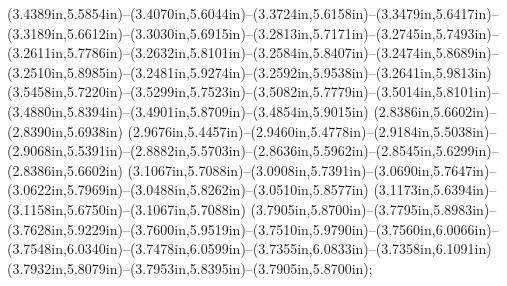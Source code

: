 (3.4389in,5.5854in)--(3.4070in,5.6044in)--(3.3724in,5.6158in)--(3.3479in,5.6417in)--(3.3189in,5.6612in)--(3.3030in,5.6915in)--(3.2813in,5.7171in)--(3.2745in,5.7493in)--(3.2611in,5.7786in)--(3.2632in,5.8101in)--(3.2584in,5.8407in)--(3.2474in,5.8689in)--(3.2510in,5.8985in)--(3.2481in,5.9274in)--(3.2592in,5.9538in)--(3.2641in,5.9813in) (3.5458in,5.7220in)--(3.5299in,5.7523in)--(3.5082in,5.7779in)--(3.5014in,5.8101in)--(3.4880in,5.8394in)--(3.4901in,5.8709in)--(3.4854in,5.9015in) (2.8386in,5.6602in)--(2.8390in,5.6938in) (2.9676in,5.4457in)--(2.9460in,5.4778in)--(2.9184in,5.5038in)--(2.9068in,5.5391in)--(2.8882in,5.5703in)--(2.8636in,5.5962in)--(2.8545in,5.6299in)--(2.8386in,5.6602in) (3.1067in,5.7088in)--(3.0908in,5.7391in)--(3.0690in,5.7647in)--(3.0622in,5.7969in)--(3.0488in,5.8262in)--(3.0510in,5.8577in) (3.1173in,5.6394in)--(3.1158in,5.6750in)--(3.1067in,5.7088in) (3.7905in,5.8700in)--(3.7795in,5.8983in)--(3.7628in,5.9229in)--(3.7600in,5.9519in)--(3.7510in,5.9790in)--(3.7560in,6.0066in)--(3.7548in,6.0340in)--(3.7478in,6.0599in)--(3.7355in,6.0833in)--(3.7358in,6.1091in) (3.7932in,5.8079in)--(3.7953in,5.8395in)--(3.7905in,5.8700in);
